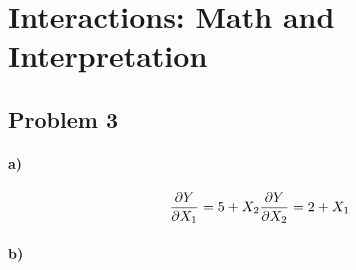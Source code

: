 \documentclass[12pt]{article}\usepackage[]{graphicx}\usepackage[]{color}
\begin{document}
\section*{Interactions: Math and Interpretation}

\subsection*{Problem 3}

\paragraph*{a)}

\begin{displaymath}

\dfrac{\partial Y}{\partial X_1} = 5 + X_2

\bigskip

\dfrac{\partial Y}{\partial X_2} = 2 + X_1

\end{displaymath}

\paragraph*{b)}
\end{document}
